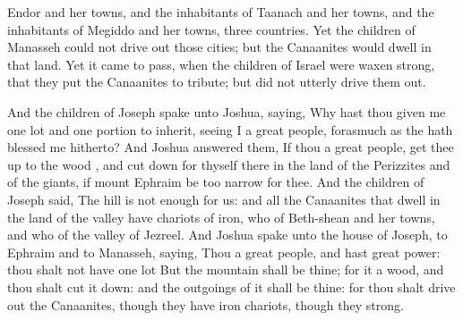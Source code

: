{Endor and her
towns, and the
inhabitants of
Taanach and her
towns, and the
inhabitants of
Megiddo and her
towns,
{}
three
countries.
Yet the
children of
Manasseh
could not drive
out
{} those
cities; but the
Canaanites
would
dwell in that
land.
Yet it came to pass, when the
children of
Israel were waxen
strong, that they
put the
Canaanites to
tribute; but did not
utterly drive them
out.
\par }{\PP {}And the
children of
Joseph
spake unto
Joshua,
saying, Why hast thou
given me
{}
one
lot and
one
portion to
inherit, seeing I
{} a
great
people, forasmuch
as the
{} hath
blessed me
hitherto?
And
Joshua
answered them, If thou
{} a
great
people,
{} get thee
up to the
wood
{}, and cut
down for thyself there in the
land of the
Perizzites and of the
giants, if
mount
Ephraim be too
narrow for thee.
And the
children of
Joseph
said, The
hill is not
enough for us: and all the
Canaanites that
dwell in the
land of the
valley have
chariots of
iron,
{} who
{} of
Beth-shean and her
towns, and
{} who
{} of the
valley of
Jezreel.
And
Joshua
spake unto the
house of
Joseph,
{} to
Ephraim and to
Manasseh,
saying, Thou
{} a
great
people, and hast
great
power: thou shalt not have
one
lot
{}
But the
mountain shall be thine; for it
{} a
wood, and thou shalt cut it
down: and the
outgoings of it shall be thine: for thou shalt drive
out the
Canaanites, though they have
iron
chariots,
{} though they
{}
strong.

}
